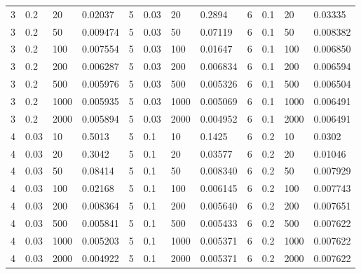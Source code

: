 \begin{table}[h!]
\begin{tabular}{|l|l|l|l||l|l|l|l||l|l|l|l|}
        3 & 0.2  & 20   & 0.02037  &  5 & 0.03 & 20   & 0.2894   & 6 & 0.1  & 20   & 0.03335  \\
        3 & 0.2  & 50   & 0.009474 &  5 & 0.03 & 50   & 0.07119  & 6 & 0.1  & 50   & 0.008382 \\
        3 & 0.2  & 100  & 0.007554 &  5 & 0.03 & 100  & 0.01647  & 6 & 0.1  & 100  & 0.006850 \\
        3 & 0.2  & 200  & 0.006287 &  5 & 0.03 & 200  & 0.006834 & 6 & 0.1  & 200  & 0.006594 \\
        3 & 0.2  & 500  & 0.005976 &  5 & 0.03 & 500  & 0.005326 & 6 & 0.1  & 500  & 0.006504 \\
        3 & 0.2  & 1000 & 0.005935 &  5 & 0.03 & 1000 & 0.005069 & 6 & 0.1  & 1000 & 0.006491 \\
        3 & 0.2  & 2000 & 0.005894 &  5 & 0.03 & 2000 & 0.004952 & 6 & 0.1  & 2000 & 0.006491 \\
        4 & 0.03 & 10   & 0.5013   &  5 & 0.1  & 10   & 0.1425   & 6 & 0.2  & 10   & 0.0302   \\
        4 & 0.03 & 20   & 0.3042   &  5 & 0.1  & 20   & 0.03577  & 6 & 0.2  & 20   & 0.01046  \\
        4 & 0.03 & 50   & 0.08414  &  5 & 0.1  & 50   & 0.008340 & 6 & 0.2  & 50   & 0.007929 \\
        4 & 0.03 & 100  & 0.02168  &  5 & 0.1  & 100  & 0.006145 & 6 & 0.2  & 100  & 0.007743 \\
        4 & 0.03 & 200  & 0.008364 &  5 & 0.1  & 200  & 0.005640 & 6 & 0.2  & 200  & 0.007651 \\
        4 & 0.03 & 500  & 0.005841 &  5 & 0.1  & 500  & 0.005433 & 6 & 0.2  & 500  & 0.007622 \\
        4 & 0.03 & 1000 & 0.005203 &  5 & 0.1  & 1000 & 0.005371 & 6 & 0.2  & 1000 & 0.007622 \\
        4 & 0.03 & 2000 & 0.004922 &  5 & 0.1  & 2000 & 0.005371 & 6 & 0.2  & 2000 & 0.007622 \\
    \end{tabular}

\end{table}
